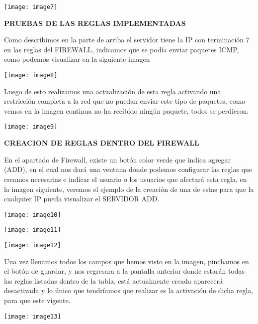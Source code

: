 \noindent \texttt{[image: image7]}

\noindent \textbf{PRUEBAS DE LAS REGLAS IMPLEMENTADAS }

\noindent Como describimos en la parte de arriba el servidor tiene la IP con terminaci\'{o}n 7 en las reglas del FIREWALL, indicamos que se pod\'{i}a enviar paquetes ICMP, como podemos visualizar en la siguiente imagen

\noindent 

\noindent \texttt{[image: image8]}

\noindent Luego de esto realizamos una actualizaci\'{o}n de esta regla activando una restricci\'{o}n completa a la red que no puedan enviar este tipo de paquetes, como vemos en la imagen continua no ha recibido ning\'{u}n paquete, todos se perdieron.

\noindent \texttt{[image: image9]}

\noindent 

\noindent \textbf{CREACION DE REGLAS DENTRO DEL FIREWALL}

\noindent En el apartado de Firewall, existe un bot\'{o}n color verde que indica agregar (ADD), en el cual nos dar\'{a} una ventana donde podemos configurar las reglas que creamos necesarias e indicar el usuario o los usuarios que afectar\'{a} esta regla, en la imagen siguiente, veremos el ejemplo de la creaci\'{o}n de una de estas para que la cualquier IP pueda visualizar el SERVIDOR ADD.

\noindent \texttt{[image: image10]}

\noindent \texttt{[image: image11]}

\noindent \texttt{[image: image12]}

\noindent Una vez llenamos todos los campos que hemos visto en la imagen, pinchamos en el bot\'{o}n de guardar, y nos regresara a la pantalla anterior donde estar\'{a}n todas las reglas listadas dentro de la tabla, est\'{a} actualmente creada aparecer\'{a} desactivada y lo \'{u}nico que tendr\'{i}amos que realizar es la activaci\'{o}n de dicha regla, para que este vigente. 

\noindent \texttt{[image: image13]}

\noindent 

